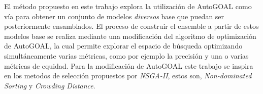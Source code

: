 El método propuesto en este trabajo explora la utilización de AutoGOAL como vía para obtener un conjunto de modelos \emph{diversos} base que puedan ser posteriormente ensamblados.
El proceso de construir el ensemble a partir de estos modelos base se realiza mediante una modificación del algoritmo de optimización de AutoGOAL, la cual permite explorar el espacio de búsqueda optimizando simultáneamente varias métricas, como por ejemplo la precisión y una o varias métricas de equidad.
Para la modificación de AutoGOAL este trabajo se inspira en los metodos de selección propuestos por \emph{NSGA-II}, estos son, \emph{Non-dominated Sorting} y \emph{Crowding Distance}.